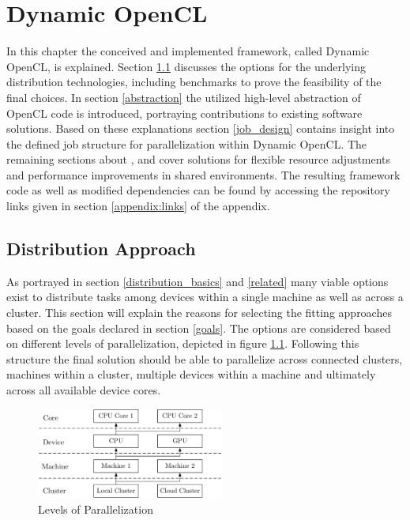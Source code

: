 \chapter{Dynamic OpenCL}
\label{main}
In this chapter the conceived and implemented framework, called Dynamic OpenCL, is explained. Section \ref{distribution} discusses the options for the underlying distribution technologies, including benchmarks to prove the feasibility of the final choices. In section \ref{abstraction} the utilized high-level abstraction of OpenCL code is introduced, portraying contributions to existing software solutions. Based on these explanations section \ref{job_design} contains insight into the defined job structure for parallelization within Dynamic OpenCL. The remaining sections about \textit{}, \textit{} and \textit{} cover solutions for flexible resource adjustments and performance improvements in shared environments. The resulting framework code as well as modified dependencies can be found by accessing the repository links given in section \ref{appendix:links} of the appendix.

\section{Distribution Approach}
\label{distribution}
As portrayed in section \ref{distribution_basics} and \ref{related} many viable options exist to distribute tasks among devices within a single machine as well as across a cluster. This section will explain the reasons for selecting the fitting approaches based on the goals declared in section \ref{goals}. The options are considered based on different levels of parallelization, depicted in figure \ref{img:parallelization_levels}. Following this structure the final solution should be able to parallelize across connected clusters, machines within a cluster, multiple devices within a machine and ultimately across all available device cores.

\begin{figure}[H]
	\includegraphics[width=0.55\textwidth]{drawings/parallelization_struct.pdf}
	\centering
	\caption{Levels of Parallelization}
	\label{img:parallelization_levels}
\end{figure}

